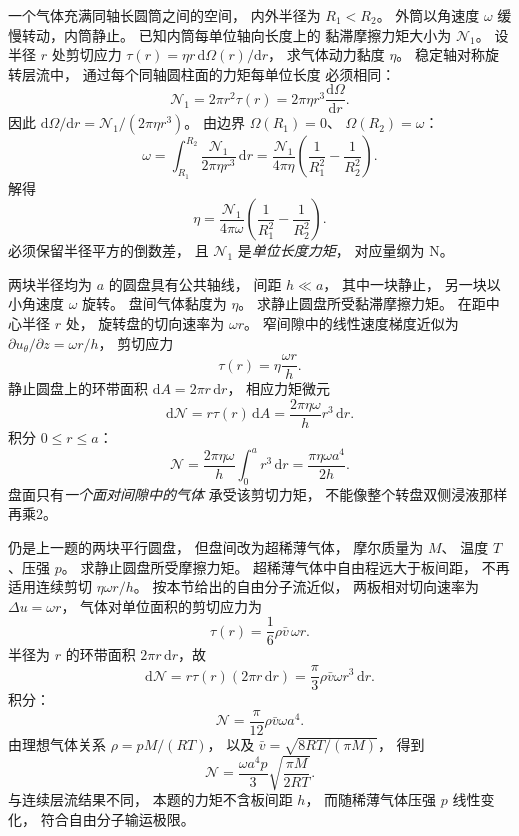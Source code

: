 一个气体充满同轴长圆筒之间的空间，
内外半径为 $R_1<R_2$。
外筒以角速度 $\omega$ 缓慢转动，内筒静止。
已知内筒每单位轴向长度上的
黏滞摩擦力矩大小为 $\mathcal N_1$。
设半径 $r$ 处剪切应力
$\tau(r)=\eta r\,\mathrm d\Omega(r)/\mathrm dr$，
求气体动力黏度 $\eta$。
\exsolution
稳定轴对称旋转层流中，
通过每个同轴圆柱面的力矩每单位长度
必须相同：
\[
\mathcal N_1=2\pi r^2\tau(r)
=2\pi\eta r^3
\frac{\mathrm d\Omega}{\mathrm dr}.
\]
因此
$\mathrm d\Omega/\mathrm dr=
\mathcal N_1/(2\pi\eta r^3)$。
由边界
$\Omega(R_1)=0$、
$\Omega(R_2)=\omega$：
\[
\omega=\int_{R_1}^{R_2}
\frac{\mathcal N_1}{2\pi\eta r^3}\,\mathrm dr
=\frac{\mathcal N_1}{4\pi\eta}
\left(\frac1{R_1^2}-\frac1{R_2^2}\right).
\]
解得
\[
\boxed{\eta=\frac{\mathcal N_1}{4\pi\omega}
\left(\frac1{R_1^2}-\frac1{R_2^2}\right)}.
\]
\excheck 必须保留半径平方的倒数差，
且 $\mathcal N_1$ 是\emph{单位长度力矩}，
对应量纲为 $\mathrm{N}$。

两块半径均为 $a$ 的圆盘具有公共轴线，
间距 $h\ll a$，
其中一块静止，
另一块以小角速度 $\omega$ 旋转。
盘间气体黏度为 $\eta$。
求静止圆盘所受黏滞摩擦力矩。
\exsolution
在距中心半径 $r$ 处，
旋转盘的切向速率为 $\omega r$。
窄间隙中的线性速度梯度近似为
$\partial u_\theta/\partial z=\omega r/h$，
剪切应力
\[
\tau(r)=\eta\frac{\omega r}{h}.
\]
静止圆盘上的环带面积
$\mathrm dA=2\pi r\,\mathrm dr$，
相应力矩微元
\[
\mathrm d\mathcal N=
r\tau(r)\,\mathrm dA
=\frac{2\pi\eta\omega}{h}r^3\,\mathrm dr.
\]
积分 $0\le r\le a$：
\[
\boxed{\mathcal N=
\frac{2\pi\eta\omega}{h}
\int_0^a r^3\,\mathrm dr
=\frac{\pi\eta\omega a^4}{2h}}.
\]
\excheck 盘面只有\emph{一个面对间隙中的气体}
承受该剪切力矩，
不能像整个转盘双侧浸液那样再乘2。

仍是上一题的两块平行圆盘，
但盘间改为超稀薄气体，
摩尔质量为 $M$、
温度 $T$、压强 $p$。
求静止圆盘所受摩擦力矩。
\exsolution
超稀薄气体中自由程远大于板间距，
不再适用连续剪切
$\eta\omega r/h$。
按本节给出的自由分子流近似，
两板相对切向速率为
$\Delta u=\omega r$，
气体对单位面积的剪切应力为
\[
\tau(r)=\frac16\rho\bar v\,\omega r.
\]
半径为 $r$ 的环带面积
$2\pi r\,\mathrm dr$，故
\[
\mathrm d\mathcal N
=r\tau(r)(2\pi r\,\mathrm dr)
=\frac{\pi}3\rho\bar v\omega r^3\,\mathrm dr.
\]
积分：
\[
\mathcal N=\frac{\pi}{12}\rho\bar v\omega a^4.
\]
由理想气体关系
$\rho=pM/(RT)$，
以及
$\bar v=\sqrt{8RT/(\pi M)}$，
得到
\[
\boxed{\mathcal N=
\frac{\omega a^4p}{3}
\sqrt{\frac{\pi M}{2RT}}}.
\]
\excheck 与连续层流结果不同，
本题的力矩不含板间距 $h$，
而随稀薄气体压强 $p$ 线性变化，
符合自由分子输运极限。
